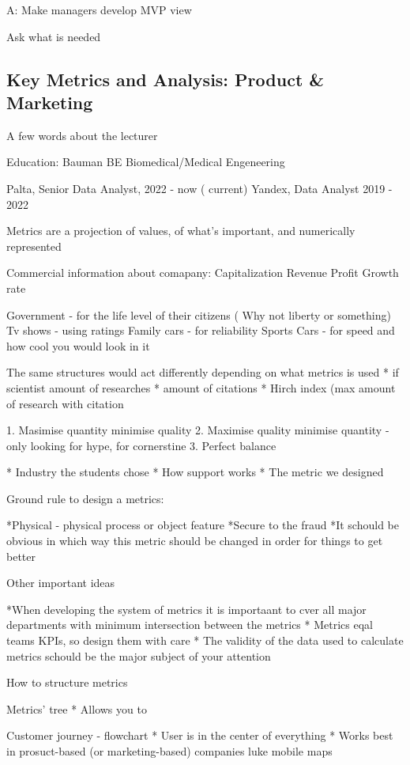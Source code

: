 \documentclass[12pt, a4paper, oneside]{article}
\begin{document}
A:
Make managers develop MVP view 

Ask what is needed 
\subsection{Key Metrics and Analysis: Product & Marketing}

A few words about the lecturer 

Education: Bauman BE Biomedical/Medical Engeneering

Palta, Senior Data Analyst, 2022 - now ( current)  
Yandex, Data Analyst 2019 - 2022

Metrics are a projection of values, of what's important, and numerically represented 

Commercial information about comapany:
Capitalization
Revenue
Profit
Growth rate

Government - for the life level of their citizens ( Why not liberty or something)
Tv shows - using ratings
Family cars - for reliability
Sports Cars - for speed and how cool you would look in it 

The same structures would act differently depending on what metrics is used 
* if scientist amount of researches
* amount of citations
* Hirch index (max amount of research with citation 

1. Masimise quantity minimise quality
2. Maximise quality minimise quantity - only looking for hype, for cornerstine
3. Perfect balance 



* Industry the students chose
* How support works
* The metric we designed 


Ground rule to design a metrics:

*Physical - physical process or object feature 
*Secure to the fraud 
*It schould be obvious in which way this metric should be changed in order for things to get better 

Other important ideas 

*When developing the system of metrics it is importaant to cver all major departments with minimum intersection between the metrics
* Metrics eqal teams KPIs, so design them with care
* The validity of the data used to calculate metrics schould be the major subject of your attention 


How to structure metrics

Metrics' tree
* Allows you to 

Customer journey - flowchart
* User is in the center of everything
* Works best in prosuct-based (or marketing-based) companies luke mobile maps 
\end{document}
